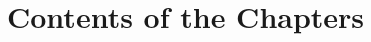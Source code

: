 \section{Contents of the Chapters}
\label{chapter:introduction:sec:contents-of-the-chapters}






%
%
%
%
%
%
%
%
%
%
%
